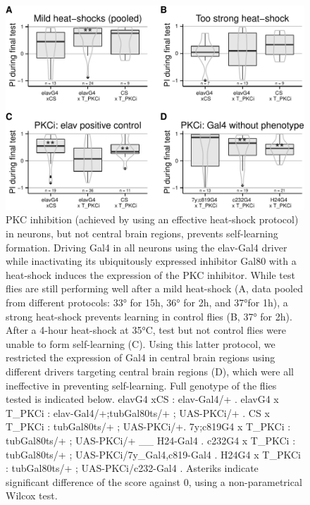 \documentclass[]{article}
\begin{document}
\begin{figure}[htbp]
\centering
\includegraphics{firsttest_files/figure-latex/unnamed-chunk-3-1.pdf}
\caption{\label{fig:heatshock} PKC inhibition (achieved by using an
effective heat-shock protocol) in neurons, but not central brain
regions, prevents self-learning formation. Driving Gal4 in all neurons
using the elav-Gal4 driver while inactivating its ubiquitously expressed
inhibitor Gal80 with a heat-shock induces the expression of the PKC
inhibitor. While test flies are still performing well after a mild
heat-shock (A, data pooled from different protocols: 33° for 15h, 36°
for 2h, and 37°for 1h), a strong heat-shock prevents learning in control
flies (B, 37° for 2h). After a 4-hour heat-shock at 35°C, test but not
control flies were unable to form self-learning (C). Using this latter
protocol, we restricted the expression of Gal4 in central brain regions
using different drivers targeting central brain regions (D), which were
all ineffective in preventing self-learning. Full genotype of the flies
tested is indicated below. elavG4 xCS : elav-Gal4/+ . elavG4 x T\_PKCi :
elav-Gal4/+;tubGal80ts/+ ; UAS-PKCi/+ . CS x T\_PKCi : tubGal80ts/+ ;
UAS-PKCi/+. 7y;c819G4 x T\_PKCi : tubGal80ts/+ ; UAS-PKCi/+ \_\_
H24-Gal4 . c232G4 x T\_PKCi : tubGal80ts/+ ; UAS-PKCi/7y\_Gal4,c819-Gal4
. H24G4 x T\_PKCi : tubGal80ts/+ ; UAS-PKCi/c232-Gal4 . Asteriks
indicate significant difference of the score against 0, using a
non-parametrical Wilcox test.}
\end{figure}
\end{document}
